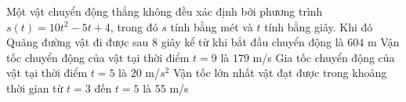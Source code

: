 \begin{ex}%

	Một vật chuyển động thẳng không đều xác định bởi phương trình $s(t)=10 t^{2} - 5 t + 4$, trong đó ${s}$ tính bằng mét và ${t}$ tính bằng giây. Khi đó
	\choiceTF
	{ \True Quãng đường vật đi được sau ${8}$ giây kể từ khi bắt đầu chuyển động là ${604}$ m}
	{ Vận tốc chuyển động của vật tại thời điểm $t=9$ là ${179}$ m/s}
	{ \True Gia tốc chuyển động của vật tại thời điểm $t=5$ là ${20}$ m/$s^2$}
	{ Vận tốc lớn nhất vật đạt được trong khoảng thời gian từ $t=3$ đến $t=5$ là $55$ m/s}
	\end{ex}

